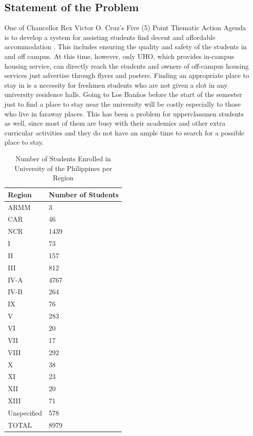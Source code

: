\documentclass[journal]{./IEEE/IEEEtran}
\begin{document}
\subsection{Statement of the Problem}
One of Chancellor Rex Victor O. Cruz's Five (5) Point Thematic Action Agenda is to develop a system for assisting students find decent and affordable accommodation \cite{electronic_mv}.  This includes ensuring the quality and safety of the students in and off campus. At this time, however, only UHO, which provides in-campus housing service, can directly reach the students and owners of off-campus housing services just advertise through flyers and posters.
Finding an appropriate place to stay in is  a necessity for freshmen students who are not given a slot in any university residence halls. Going to Los Ban\~{n}os before the start of the semester just to find a place to stay near the university will be costly especially to those who live in faraway places. This has been a problem for upperclassmen students as well, since most of them are busy with their academics and other extra curricular activities and they do not have an ample time to search for a possible place to stay.
\begin{table}
	\centering
	\caption{Number of Students Enrolled in University of the Philippines per Region \cite{misc_t}} 
    \begin{tabular}{ | p{1.5cm} | p{1.5cm} |}
    \hline
   	Region & Number of Students \\ \hline
    ARMM & 3 \\ \hline
    CAR & 46 \\ \hline
    NCR & 1439 \\ \hline
    I & 73 \\ \hline
    II & 157 \\ \hline
    III & 812 \\ \hline
    IV-A & 4767 \\ \hline
    IV-B & 264 \\ \hline
    IX & 76 \\ \hline
    V & 283 \\ \hline
    VI & 20 \\ \hline
    VII & 17 \\ \hline
    VIII & 292 \\ \hline
    X & 38 \\ \hline
    XI & 23 \\ \hline
    XII & 20 \\ \hline
    XIII & 71 \\ \hline
    Unspecified & 578 \\ \hline
    TOTAL & 8979 \\ \hline
    \end{tabular}
    
	\end{table}	
\end{document}

